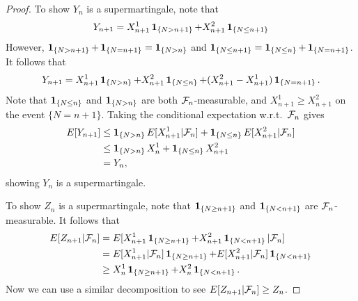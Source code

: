 \documentclass[a4paper]{article}
\begin{document}
\begin{proof}
  To show $Y_n$ is a supermartingale, note that 
  \[
  Y_{n + 1} = X_{n + 1}^1 \operatorname{\mathbf{1}}_{\{N > n + 1\}} + X_{n + 1}^2 \operatorname{\mathbf{1}}_{\{N \leq n + 1\}}
  \]
  However, $\operatorname{\mathbf{1}}_{\{N > n + 1\}} + \operatorname{\mathbf{1}}_{\{N = n + 1\}} = \operatorname{\mathbf{1}}_{\{N > n\}}$
  and $\operatorname{\mathbf{1}}_{\{N \leq n + 1\}} = \operatorname{\mathbf{1}}_{\{N \leq n\}} + \operatorname{\mathbf{1}}_{\{N = n + 1\}}$.
  It follows that 
  \[
  Y_{n + 1} = X_{n + 1}^1 \operatorname{\mathbf{1}}_{\{N > n\}}
  + X_{n + 1}^2 \operatorname{\mathbf{1}}_{\{N \leq n\}}
  + (X_{n+1}^2 - X_{n+1}^1) \operatorname{\mathbf{1}}_{\{N = n + 1\}}.
  \]
  Note that $\operatorname{\mathbf{1}}_{\{N \leq n\}}$ and 
  $\operatorname{\mathbf{1}}_{\{N > n\}}$ are both $\mathcal{F}_n$-measurable, and 
  $X_{n+1}^1 \geq X_{n+1}^2$ on the event $\{N = n + 1\}$.
  Taking the conditional expectation w.r.t.\ $\mathcal{F}_n$ gives
  \begin{align*}
    E[Y_{n + 1}] 
    &\leq \operatorname{\mathbf{1}}_{\{N > n\}} E[X_{n+1}^1 | \mathcal{F}_n]
    + \operatorname{\mathbf{1}}_{\{N \leq n\}} E[X_{n+1}^2 | \mathcal{F}_n] \\
    &\leq \operatorname{\mathbf{1}}_{\{N > n\}} X_n^1 + \operatorname{\mathbf{1}}_{\{N \leq n\}} X_{n+1}^2 \\
    &= Y_n,
  \end{align*}
  showing $Y_n$ is a supermartingale.

  To show $Z_n$ is a supermartingale, note that $\operatorname{\mathbf{1}}_{\{N \geq n + 1\}}$ 
  and $\operatorname{\mathbf{1}}_{\{N < n + 1\}}$ are $\mathcal{F}_n$-measurable. It follows that
  \begin{align*}
    E[Z_{n + 1} | \mathcal{F}_n]
    &= E[X_{n + 1}^1 \operatorname{\mathbf{1}}_{\{N \geq n + 1\}} + X_{n + 1}^2 \operatorname{\mathbf{1}}_{\{N < n + 1\}} | \mathcal{F}_n] \\
    &= E[X_{n + 1}^1 | \mathcal{F}_n] \operatorname{\mathbf{1}}_{\{N \geq n + 1\}} + E[X_{n + 1}^2  | \mathcal{F}_n] \operatorname{\mathbf{1}}_{\{N < n + 1\}} \\
    &\geq X_n^1 \operatorname{\mathbf{1}}_{\{N \geq n + 1\}} + X_n^2 \operatorname{\mathbf{1}}_{\{N < n + 1\}}.
  \end{align*}
  Now we can use a similar decomposition to see
  $E[Z_{n + 1} | \mathcal{F}_n] \geq Z_n$.
  
\end{proof}
\end{document}

